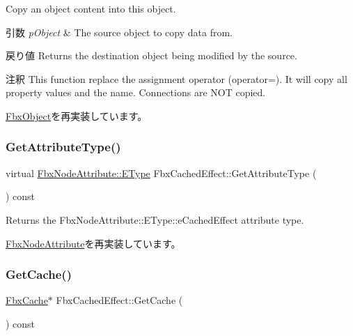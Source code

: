 Copy an object content into this object. 
\begin{DoxyParams}{引数}
{\em p\+Object} & The source object to copy data from. \\
\hline
\end{DoxyParams}
\begin{DoxyReturn}{戻り値}
Returns the destination object being modified by the source. 
\end{DoxyReturn}
\begin{DoxyRemark}{注釈}
This function replace the assignment operator (operator=). It will copy all property values and the name. Connections are N\+OT copied. 
\end{DoxyRemark}


\hyperlink{class_fbx_object_a0c0c5adb38284d14bb82c04d54504a3e}{Fbx\+Object}を再実装しています。

\mbox{\label{class_fbx_cached_effect_a4c904f4208d8e9f3ddbb49240475b6cc}} 
\subsubsection{\texorpdfstring{Get\+Attribute\+Type()}{GetAttributeType()}}
{\footnotesize\ttfamily virtual \hyperlink{class_fbx_node_attribute_a08e1669d3d1a696910756ab17de56d6a}{Fbx\+Node\+Attribute\+::\+E\+Type} Fbx\+Cached\+Effect\+::\+Get\+Attribute\+Type (\begin{DoxyParamCaption}{ }\end{DoxyParamCaption}) const\hspace{0.3cm}{\ttfamily [virtual]}}



Returns the Fbx\+Node\+Attribute\+::\+E\+Type\+::e\+Cached\+Effect attribute type. 



\hyperlink{class_fbx_node_attribute_a1c2116756906127145a2b8721fc26752}{Fbx\+Node\+Attribute}を再実装しています。

\mbox{\label{class_fbx_cached_effect_aca0e9173f8aa5d446616aa92b9abbea0}} 
\subsubsection{\texorpdfstring{Get\+Cache()}{GetCache()}}
{\footnotesize\ttfamily \hyperlink{class_fbx_cache}{Fbx\+Cache}$\ast$ Fbx\+Cached\+Effect\+::\+Get\+Cache (\begin{DoxyParamCaption}{ }\end{DoxyParamCaption}) const}

